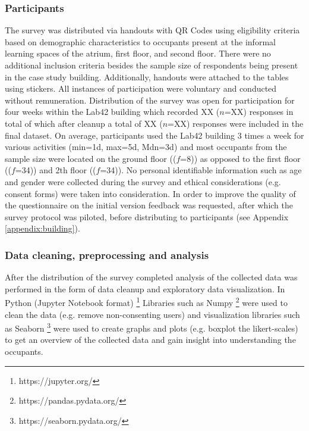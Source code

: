 \subsubsection{Participants}
The survey was distributed via handouts with QR Codes using eligibility criteria based on demographic characteristics to occupants present at the informal learning spaces of the atrium, first floor, and second floor. There were no additional inclusion criteria besides the sample size of respondents being present in the case study building. Additionally, handouts were attached to the tables using stickers. All instances of participation were voluntary and conducted without remuneration. Distribution of the survey was open for participation for four weeks within the Lab42 building which recorded XX ($n$=XX) responses in total of which after cleanup a total of XX ($n$=XX) responses were included in the final dataset. On average, participants used the Lab42 building 3 times a week for various activities (min=1d, max=5d, Mdn=3d) and most occupants from the sample size were located on the ground floor (($f$=8)) as opposed to the first floor (($f$=34)) and 2th floor (($f$=34)). No personal identifiable information such as age and gender were collected during the survey and ethical considerations (e.g. consent forms) were taken into consideration. In order to improve the quality of the questionnaire on the initial version feedback was requested, after which the survey protocol was piloted, before distributing to participants (see Appendix \ref{appendix:building}).

\subsubsection{Data cleaning, preprocessing and analysis}
\label{sec:analysis}
After the distribution of the survey completed analysis of the collected data was performed in the form of data cleanup and exploratory data visualization. In Python (Jupyter Notebook format) \footnote{https://jupyter.org/} Libraries such as Numpy \footnote{https://pandas.pydata.org/} were used to clean the data (e.g. remove non-consenting users) and visualization libraries such as Seaborn \footnote{https://seaborn.pydata.org/} were used to create graphs and plots (e.g. boxplot the likert-scales) to get an overview of the collected data and gain insight into understanding the occupants.

